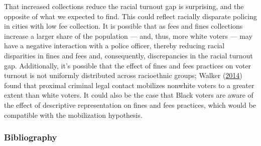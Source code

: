 \documentclass[
  12pt,
]{article}
\begin{document}
That increased collections reduce the racial turnout gap is surprising, and the opposite of what we expected to find. This could reflect racially disparate policing in cities with low fee collection. It is possible that as fees and fines collections increase a larger share of the population --- and, thus, more white voters --- may have a negative interaction with a police officer, thereby reducing racial disparities in fines and fees and, consequently, discrepancies in the racial turnout gap. Additionally, it's possible that the effect of fines and fees practices on voter turnout is not uniformly distributed across racioethnic groups; Walker (\protect\hyperlink{ref-Walker2014}{2014}) found that proximal criminal legal contact mobilizes nonwhite voters to a greater extent than white voters. It could also be the case that Black voters are aware of the effect of descriptive representation on fines and fees practices, which would be compatible with the mobilization hypothesis.

\newpage

\hypertarget{bibliography}{%
\subsubsection*{Bibliography}\label{bibliography}}
\end{document}
